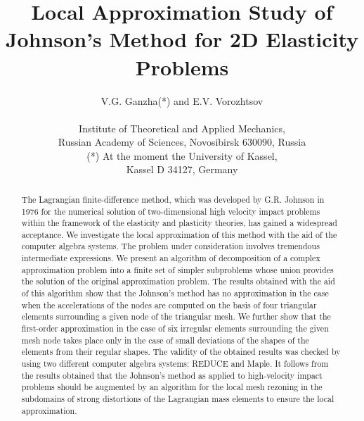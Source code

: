 \pagestyle{plain}
\title{Local Approximation Study of Johnson's Method for 2D Elasticity
Problems}
\author{
V.G. Ganzha(*) and E.V. Vorozhtsov\\
\\
            Institute of Theoretical and Applied Mechanics,\\
           Russian Academy of Sciences, Novosibirsk 630090, Russia\\
(*) At the moment the University of Kassel, \\ Kassel D 34127, Germany}
\date{}

\maketitle
\begin{abstract}
\hspace{1cm}
    The Lagrangian finite-difference method, which was developed by
G.R. Johnson in 1976 for the numerical solution of two-dimensional high
velocity impact problems within the framework of the elasticity and plasticity
theories, has gained a widespread acceptance. We investigate the local
approximation of this method with the aid of the computer algebra systems.
The problem under consideration involves tremendous intermediate expressions.
We present an algorithm of decomposition of a complex approximation problem
into a finite set of simpler subproblems whose union provides the solution of
the original approximation problem. The results obtained with the aid of this
algorithm show that the Johnson's method has no approximation in the case when
the accelerations of the nodes are computed on the basis of four triangular
elements surrounding a given node of the triangular mesh. We further show
that the first-order approximation in the case of six irregular elements
surrounding the given mesh node takes place only in the case of small
deviations of the shapes of the elements from their regular shapes. The
validity of the obtained results was checked by using two different computer
algebra systems: REDUCE and Maple. It follows from the results obtained that
the Johnson's method as applied to high-velocity impact problems should be
augmented by an algorithm for the local mesh rezoning in the subdomains of
strong distortions of the Lagrangian mass elements to ensure the local
approximation.
\end{abstract}

